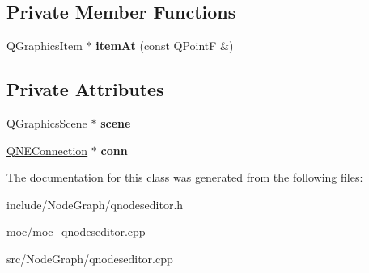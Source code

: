 \subsection*{Private Member Functions}
\begin{DoxyCompactItemize}
\item 
\hypertarget{class_q_nodes_editor_a2721a9937b61435c597bc9623a3e19a2}{Q\-Graphics\-Item $\ast$ {\bfseries item\-At} (const Q\-Point\-F \&)}\label{class_q_nodes_editor_a2721a9937b61435c597bc9623a3e19a2}

\end{DoxyCompactItemize}
\subsection*{Private Attributes}
\begin{DoxyCompactItemize}
\item 
\hypertarget{class_q_nodes_editor_ad7c05f0ec89632b41a2acef2478e9045}{Q\-Graphics\-Scene $\ast$ {\bfseries scene}}\label{class_q_nodes_editor_ad7c05f0ec89632b41a2acef2478e9045}

\item 
\hypertarget{class_q_nodes_editor_a094c0f259f96e519ead8b52968cfa0c6}{\hyperlink{class_q_n_e_connection}{Q\-N\-E\-Connection} $\ast$ {\bfseries conn}}\label{class_q_nodes_editor_a094c0f259f96e519ead8b52968cfa0c6}

\end{DoxyCompactItemize}


The documentation for this class was generated from the following files\-:\begin{DoxyCompactItemize}
\item 
include/\-Node\-Graph/qnodeseditor.\-h\item 
moc/moc\-\_\-qnodeseditor.\-cpp\item 
src/\-Node\-Graph/qnodeseditor.\-cpp\end{DoxyCompactItemize}
